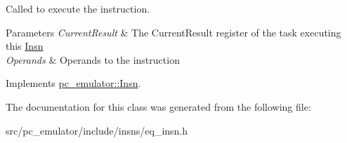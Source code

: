 Called to execute the instruction. 


\begin{DoxyParams}{Parameters}
{\em Current\+Result} & The Current\+Result register of the task executing this \hyperlink{classpc__emulator_1_1Insn}{Insn} \\
\hline
{\em Operands} & Operands to the instruction \\
\hline
\end{DoxyParams}


Implements \hyperlink{classpc__emulator_1_1Insn_a103d27030e872a799e313df16c1f3d66}{pc\+\_\+emulator\+::\+Insn}.



The documentation for this class was generated from the following file\+:\begin{DoxyCompactItemize}
\item 
src/pc\+\_\+emulator/include/insns/eq\+\_\+insn.\+h\end{DoxyCompactItemize}
